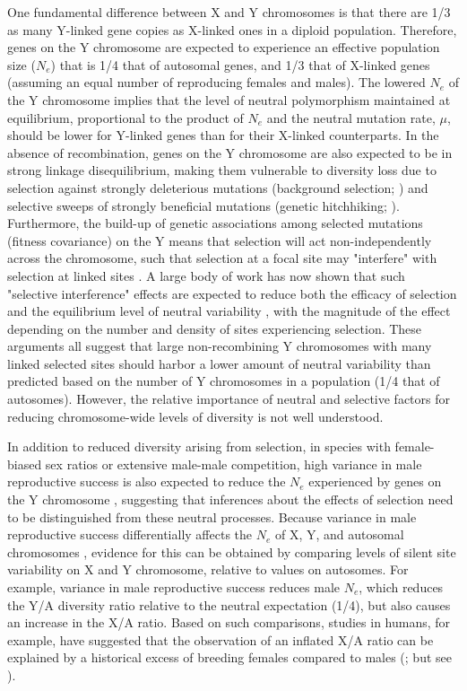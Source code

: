 \documentclass[9pt,twocolumn,twoside,lineno]{gsajnl}
\begin{document}
One fundamental difference between X and Y chromosomes is that there are 1/3 as many Y-linked gene copies as X-linked ones in a diploid population. Therefore, genes on the Y chromosome are expected to experience an effective population size ($N_{e}$) that is 1/4 that of autosomal genes, and 1/3 that of X-linked genes (assuming an equal number of reproducing females and males). The lowered $N_{e}$ of the Y chromosome implies that the level of neutral polymorphism maintained at equilibrium, proportional to the product of $N_{e}$ and the neutral mutation rate, $\mu$, should be lower for Y-linked genes than for their X-linked counterparts. In the absence of recombination, genes on the Y chromosome are also expected to be in strong linkage disequilibrium, making them vulnerable to diversity loss due to selection against strongly deleterious mutations (background selection; \citealt{charlesworth1993effect}) and selective sweeps of strongly beneficial mutations (genetic hitchhiking; \citealt{smith1974hitch}). Furthermore, the build-up of genetic associations among selected mutations (fitness covariance) on the Y means that selection will act non-independently across the chromosome, such that selection at a focal site may "interfere" with selection at linked sites \citep{hill1966HReffect}. A large body of work has now shown that such "selective interference" effects are expected to reduce both the efficacy of selection and the equilibrium level of neutral variability \citep{fisher1930genetical, muller1964relation, hill1966HReffect, mcvean2000,KaiserCharlesworth,good2014genetic}, with the magnitude of the effect depending on the number and density of sites experiencing selection. These arguments all suggest that large non-recombining Y chromosomes with many linked selected sites should harbor a lower amount of neutral variability than predicted based on the number of Y chromosomes in a population (1/4 that of autosomes). However, the relative importance of neutral and selective factors for reducing chromosome-wide levels of diversity is not well understood.

In addition to reduced diversity arising from selection, in species with female-biased sex ratios or extensive male-male competition, high variance in male reproductive success is also expected to reduce the $N_{e}$ experienced by genes on the Y chromosome \citep{caballero1995,charlesworth2001,laporte2002,pool2007,ellegren2009}, suggesting that inferences about the effects of selection need to be distinguished from these neutral processes. Because variance in male reproductive success differentially affects the $N_{e}$ of X, Y, and autosomal chromosomes \citep{kimura1964number,nomura2002effective}, evidence for this can be obtained by comparing levels of silent site variability on X and Y chromosome, relative to values on autosomes. For example, variance in male reproductive success reduces male $N_{e}$, which reduces the Y/A diversity ratio relative to the neutral expectation (1/4), but also causes an increase in the X/A ratio. Based on such comparisons, studies in humans, for example, have suggested that the observation of an inflated X/A ratio can be explained by a historical excess of breeding females compared to males (\citealt{hammer2008sex}; but see \citealt{bustamante2009,hammer2010,cotter2016genetic}).
\end{document}
